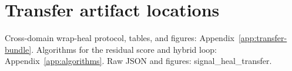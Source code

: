 
\section{Transfer artifact locations}
\label{app:transfer-pilot}

Cross-domain wrap-heal protocol, tables, and figures:
Appendix~\ref{app:transfer-bundle}.
Algorithms for the residual score and hybrid loop: Appendix~\ref{app:algorithms}.
Raw JSON and figures:
signal\_heal\_transfer.
